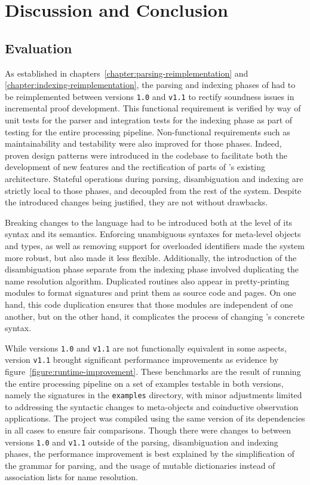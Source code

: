 \chapter{Discussion and Conclusion}

\section{Evaluation}

As established in chapters~\ref{chapter:parsing-reimplementation} and \ref{chapter:indexing-reimplementation}, the parsing and indexing phases of \Beluga had to be reimplemented between versions \texttt{1.0} and \texttt{v1.1} to rectify soundness issues in incremental proof development.
This functional requirement is verified by way of unit tests for the parser and integration tests for the indexing phase as part of testing for the entire processing pipeline.
Non-functional requirements such as maintainability and testability were also improved for those phases.
Indeed, proven design patterns were introduced in the codebase to facilitate both the development of new features and the rectification of parts of \Beluga's existing architecture.
Stateful operations during parsing, disambiguation and indexing are strictly local to those phases, and decoupled from the rest of the system.
Despite the introduced changes being justified, they are not without drawbacks.

Breaking changes to the \Beluga language had to be introduced both at the level of its syntax and its semantics.
Enforcing unambiguous syntaxes for meta-level objects and types, as well as removing support for overloaded identifiers made the system more robust, but also made it less flexible.
Additionally, the introduction of the disambiguation phase separate from the indexing phase involved duplicating the name resolution algorithm.
Duplicated routines also appear in pretty-printing modules to format \Beluga signatures and print them as source code and \HTML pages.
On one hand, this code duplication ensures that those modules are independent of one another, but on the other hand, it complicates the process of changing \Beluga's concrete syntax.

While \Beluga versions \texttt{1.0} and \texttt{v1.1} are not functionally equivalent in some aspects, version \texttt{v1.1} brought significant performance improvements as evidence by figure~\ref{figure:runtime-improvement}.
These benchmarks are the result of running the entire processing pipeline on a set of examples testable in both versions, namely the \Beluga signatures in the \texttt{examples} directory, with minor adjustments limited to addressing the syntactic changes to meta-objects and coinductive observation applications.
The project was compiled using the same version of its dependencies in all cases to ensure fair comparisons.
Though there were changes to \Beluga between versions \texttt{1.0} and \texttt{v1.1} outside of the parsing, disambiguation and indexing phases, the performance improvement is best explained by the simplification of the grammar for parsing, and the usage of mutable dictionaries instead of association lists for name resolution.

